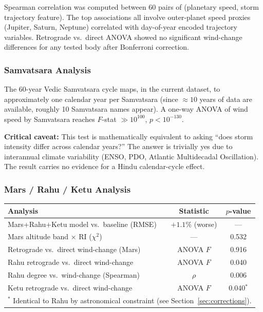 \documentclass[12pt,a4paper]{article}
\begin{document}
Spearman correlation was computed between 60 pairs of (planetary speed, storm
trajectory feature). The top associations all involve outer-planet speed proxies
(Jupiter, Saturn, Neptune) correlated with day-of-year encoded trajectory variables.
Retrograde vs.\ direct ANOVA showed no significant wind-change differences for
any tested body after Bonferroni correction.

\subsubsection{Samvatsara Analysis}

The 60-year Vedic Samvatsara cycle maps, in the current dataset, to approximately
one calendar year per Samvatsara (since $\approx 10$ years of data are available,
roughly 10 Samvatsara names appear). A one-way ANOVA of wind speed by Samvatsara
reaches $F$-stat $\gg 10^{100}$, $p < 10^{-130}$.

\textbf{Critical caveat:} This test is mathematically equivalent to asking
``does storm intensity differ across calendar years?'' The answer is trivially
yes due to interannual climate variability (ENSO, PDO, Atlantic Multidecadal
Oscillation). The result carries no evidence for a Hindu calendar-cycle effect.

\subsubsection{Mars / Rahu / Ketu Analysis}

\begin{center}
\begin{tabular}{lcc}
\toprule
\textbf{Analysis} & \textbf{Statistic} & \textbf{$p$-value} \\
\midrule
Mars+Rahu+Ketu model vs.\ baseline (RMSE) & $+1.1\%$ (worse) & --- \\
Mars altitude band $\times$ RI ($\chi^2$)  & --- & 0.532 \\
Retrograde vs.\ direct wind-change (Mars)  & ANOVA $F$ & 0.916 \\
Rahu retrograde vs.\ direct wind-change    & ANOVA $F$ & 0.040 \\
Rahu degree vs.\ wind-change (Spearman)    & $\rho$     & 0.006 \\
Ketu retrograde vs.\ direct wind-change    & ANOVA $F$ & 0.040$^*$ \\
\bottomrule
\multicolumn{3}{l}{\small $^*$ Identical to Rahu by astronomical constraint (see Section~\ref{sec:corrections}).}
\end{tabular}
\end{center}
\end{document}
